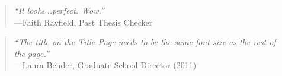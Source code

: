 \vspace{2in}

\begin{quotation}
  {\it ``It looks...perfect.  Wow.''} \\
  \hspace*{1in}---Faith Rayfield, Past Thesis Checker
\end{quotation}

\vspace{1in}

\begin{quotation}
  {\it ``The title on the Title Page needs to be the same font size as the rest of the page.''} \\ 
  \hspace*{1in}---Laura Bender, Graduate School Director (2011)
\end{quotation}
